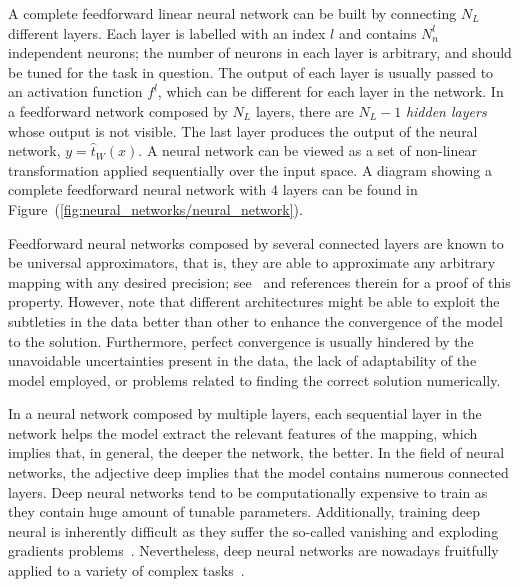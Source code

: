 \begin{figure}[H]
\end{figure}

A complete feedforward linear neural network can be built by connecting $N_L$ different layers. Each
layer is labelled with an index $l$ and contains $N_{n}^{l}$ independent neurons; the number of
neurons in each layer is arbitrary, and should be tuned for the task in question. The output of each
layer is usually passed to an activation function $f^l$, which can be different for each layer in
the network. In a feedforward network composed by $N_L$ layers, there are $N_L - 1$ \textit{hidden
layers} whose output is not visible. The last layer produces the output of the neural
network, $y = \hat{t}_W(x)$. A neural network can be viewed as a set of non-linear transformation
applied sequentially over the input space. A diagram showing a complete feedforward neural network
with $4$ layers can be found in Figure~(\ref{fig:neural_networks/neural_network}).

Feedforward neural networks composed by several connected layers are known to be universal
approximators, that is, they are able to approximate any arbitrary mapping with any desired
precision; see~\cite{hornik1989multilayer} and references therein for a proof of this property.
However, note that different architectures might be able to exploit the subtleties in the data
better than other to enhance the convergence of the model to the solution. Furthermore, perfect
convergence is usually hindered by the unavoidable uncertainties present in the data, the lack of
adaptability of the model employed, or problems related to finding the correct solution numerically. 

In a neural network composed by multiple layers, each sequential layer in the network helps the
model extract the relevant features of the mapping, which implies that, in general, the deeper the
network, the better. In the field of neural networks, the adjective deep implies that the model
contains numerous connected layers. Deep neural networks tend to be computationally expensive to
train as they contain huge amount of tunable parameters. Additionally, training deep neural is
inherently difficult as they suffer the so-called vanishing and exploding gradients
problems~\cite{glorot2010understanding}. Nevertheless, deep neural networks are nowadays fruitfully
applied to a variety of complex tasks~\cite{samek2021explaining, canziani2016analysis}.


